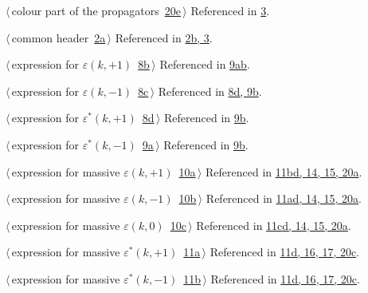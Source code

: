 \documentclass[a4paper,12pt]{amsart}
\renewcommand{\NWlink}[2]{\hyperlink{#1}{#2}}
\renewcommand{\NWtxtRefIn}{Referenced in}
\begin{document}
{\small\begin{list}{}{\setlength{\itemsep}{-\parsep}\setlength{\itemindent}{-\leftmargin}}
\item $\langle\,$colour part of the propagators\nobreak\ {\footnotesize \NWlink{nuweb20e}{20e}}$\,\rangle$ {\footnotesize {\NWtxtRefIn} \NWlink{nuweb3}{3}.}
\item $\langle\,$common header\nobreak\ {\footnotesize \NWlink{nuweb2a}{2a}}$\,\rangle$ {\footnotesize {\NWtxtRefIn} \NWlink{nuweb2b}{2b}\NWlink{nuweb3}{, 3}.
}
\item $\langle\,$expression for $\varepsilon(k, +1)$\nobreak\ {\footnotesize \NWlink{nuweb8b}{8b}}$\,\rangle$ {\footnotesize {\NWtxtRefIn} \NWlink{nuweb9a}{9a}\NWlink{nuweb9b}{b}.
}
\item $\langle\,$expression for $\varepsilon(k, -1)$\nobreak\ {\footnotesize \NWlink{nuweb8c}{8c}}$\,\rangle$ {\footnotesize {\NWtxtRefIn} \NWlink{nuweb8d}{8d}\NWlink{nuweb9b}{, 9b}.
}
\item $\langle\,$expression for $\varepsilon^\ast(k, +1)$\nobreak\ {\footnotesize \NWlink{nuweb8d}{8d}}$\,\rangle$ {\footnotesize {\NWtxtRefIn} \NWlink{nuweb9b}{9b}.}
\item $\langle\,$expression for $\varepsilon^\ast(k, -1)$\nobreak\ {\footnotesize \NWlink{nuweb9a}{9a}}$\,\rangle$ {\footnotesize {\NWtxtRefIn} \NWlink{nuweb9b}{9b}.}
\item $\langle\,$expression for massive $\varepsilon(k, +1)$\nobreak\ {\footnotesize \NWlink{nuweb10a}{10a}}$\,\rangle$ {\footnotesize {\NWtxtRefIn} \NWlink{nuweb11b}{11b}\NWlink{nuweb11d}{d}\NWlink{nuweb14}{, 14}\NWlink{nuweb15}{, 15}\NWlink{nuweb20a}{, 20a}.
}
\item $\langle\,$expression for massive $\varepsilon(k, -1)$\nobreak\ {\footnotesize \NWlink{nuweb10b}{10b}}$\,\rangle$ {\footnotesize {\NWtxtRefIn} \NWlink{nuweb11a}{11a}\NWlink{nuweb11d}{d}\NWlink{nuweb14}{, 14}\NWlink{nuweb15}{, 15}\NWlink{nuweb20a}{, 20a}.
}
\item $\langle\,$expression for massive $\varepsilon(k, 0)$\nobreak\ {\footnotesize \NWlink{nuweb10c}{10c}}$\,\rangle$ {\footnotesize {\NWtxtRefIn} \NWlink{nuweb11c}{11c}\NWlink{nuweb11d}{d}\NWlink{nuweb14}{, 14}\NWlink{nuweb15}{, 15}\NWlink{nuweb20a}{, 20a}.
}
\item $\langle\,$expression for massive $\varepsilon^\ast(k, +1)$\nobreak\ {\footnotesize \NWlink{nuweb11a}{11a}}$\,\rangle$ {\footnotesize {\NWtxtRefIn} \NWlink{nuweb11d}{11d}\NWlink{nuweb16}{, 16}\NWlink{nuweb17}{, 17}\NWlink{nuweb20c}{, 20c}.
}
\item $\langle\,$expression for massive $\varepsilon^\ast(k, -1)$\nobreak\ {\footnotesize \NWlink{nuweb11b}{11b}}$\,\rangle$ {\footnotesize {\NWtxtRefIn} \NWlink{nuweb11d}{11d}\NWlink{nuweb16}{, 16}\NWlink{nuweb17}{, 17}\NWlink{nuweb20c}{, 20c}.
}
\end{list}}
\end{document}
